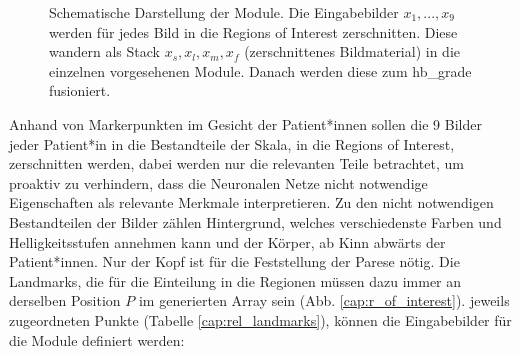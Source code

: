 \begin{figure}[!tb]
\caption[Darstellung der Modulbauweise]{{Schematische Darstellung der Module. Die Eingabebilder $x_1, ..., x_9$ werden für jedes Bild in die Regions of Interest zerschnitten. Diese wandern als Stack $x_s, x_l, x_m, x_f$ (zerschnittenes Bildmaterial) in die einzelnen vorgesehenen Module. Danach werden diese zum \ac{hb_grade} fusioniert.}\label{cap:module_graph}}
\end{figure}\label{fig:module_graph}

Anhand von Markerpunkten im Gesicht der Patient*innen sollen die 9 Bilder jeder Patient*in in die Bestandteile der Skala, in die Regions of Interest, zerschnitten werden, dabei werden nur die relevanten Teile betrachtet, um proaktiv zu verhindern, dass die Neuronalen Netze nicht notwendige Eigenschaften als relevante Merkmale interpretieren. Zu den nicht notwendigen Bestandteilen der Bilder zählen Hintergrund, welches verschiedenste Farben und Helligkeitsstufen annehmen kann und der Körper, ab Kinn abwärts der Patient*innen. Nur der Kopf ist für die Feststellung der Parese nötig. Die Landmarks, die für die Einteilung in die Regionen müssen dazu immer an derselben Position $P$ im generierten Array sein (Abb. \ref{cap:r_of_interest}). jeweils zugeordneten Punkte (Tabelle \ref{cap:rel_landmarks}), können die Eingabebilder für die Module definiert werden:


